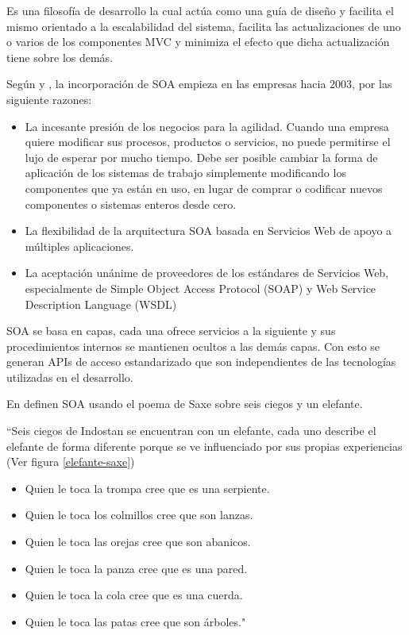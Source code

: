     Es una filosofía de desarrollo la cual actúa como una guía de diseño y facilita el mismo orientado a la escalabilidad del sistema, facilita las actualizaciones de uno o varios de los componentes MVC y minimiza el efecto que dicha actualización tiene sobre los demás.
    
    Según \citeauthor{SOA-libroGartner}\cite{SOA-libroGartner} y \citeauthor{SOA-tesis}\cite{SOA-tesis}, la incorporación de SOA empieza en las empresas hacia 2003, por las siguiente razones:
    
    \begin{itemize}
        \item La incesante presión de los negocios para la agilidad. Cuando una empresa quiere
        modificar sus procesos, productos o servicios, no puede permitirse el lujo de esperar por
        mucho tiempo. Debe ser posible cambiar la forma de aplicación de los sistemas de
        trabajo simplemente modificando los componentes que ya están en uso, en lugar de
        comprar o codificar nuevos componentes o sistemas enteros desde cero.
        
        \item La flexibilidad de la arquitectura SOA basada en Servicios Web de apoyo a múltiples
        aplicaciones.
        
        \item  La aceptación unánime de proveedores de los estándares de Servicios Web,
        especialmente de Simple Object Access Protocol (SOAP) y Web Service Description
        Language (WSDL)\cite{SOA-libroGartner}
        
    \end{itemize}
    
    SOA se basa en capas, cada una ofrece servicios a la siguiente y sus procedimientos internos se mantienen ocultos a las demás capas. Con esto se generan APIs de acceso estandarizado que son independientes de las tecnologías utilizadas en el desarrollo.
    
    En \cite{SOA-msdn} definen SOA usando el poema de Saxe sobre seis ciegos y un elefante.
    
    ``Seis ciegos de Indostan se encuentran con un elefante, cada uno describe el elefante de forma diferente porque se ve influenciado por sus propias experiencias (Ver figura \ref{elefante-saxe})
    
    \begin{itemize}
        \item Quien le toca la trompa cree que es una serpiente.
        \item Quien le toca los colmillos cree que son lanzas.
        \item Quien le toca las orejas cree que son abanicos.
        \item Quien le toca la panza cree que es una pared.
        \item Quien le toca la cola cree que es una cuerda.
        \item Quien le toca	las patas cree que son árboles."
    \end{itemize}
    

